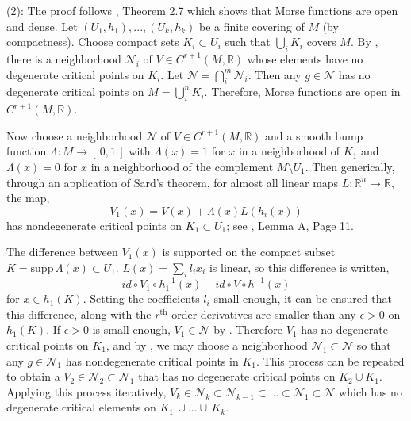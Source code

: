 \documentclass[12pt]{article}
\begin{document}
    (2): The proof follows \cite{milnor2025lectures}, Theorem 2.7 which shows that Morse functions are open and dense. Let $(U_1,h_1),...,(U_k,h_k)$ be a finite covering of $M$ (by compactness). Choose compact sets $K_i \subset U_i$ such that $\bigcup_i K_i$ covers $M$. By , there is a neighborhood $\mathcal{N}_i$ of $V \in C^{r+1}(M,\mathbb{R})$ whose elements have no degenerate critical points on $K_i$. Let $\mathcal{N} = \bigcap_i^m \mathcal{N}_i$. Then any $g \in \mathcal{N}$ has no degenerate critical points on $M = \bigcup_i^n K_i$. Therefore, Morse functions are open in $C^{r+1}(M,\mathbb{R})$.

    Now choose a neighborhood $\mathcal{N}$ of $V \in C^{r+1}(M,\mathbb{R})$ and a smooth bump function $\Lambda: M \rightarrow [\,0,1 \,]$ with $\Lambda(x) = 1$ for $x$ in a neighborhood of $K_1$ and $\Lambda(x) = 0$ for $x$ in a neighborhood of the complement $M \setminus U_1$. Then generically, through an application of Sard's theorem, for almost all linear maps $L: \mathbb{R}^n \rightarrow \mathbb{R}$, the map,
    \begin{equation*}
        V_1(x) = V(x) + \Lambda(x) L(h_i(x))
    \end{equation*}
    has nondegenerate critical points on $K_1 \subset U_1$; see \cite{milnor2025lectures}, Lemma A, Page 11.

    The difference between $V_1(x)$ is supported on the compact subset $K = \text{supp}\, \Lambda(x) \subset U_1$. $L(x) = \sum_i l_i x_i$ is linear, so this difference is written,
    \begin{equation*}
       id \circ V_1 \circ h^{-1}_1(x)  - id \circ V \circ h^{-1} (x)
    \end{equation*}
    for $x \in h_1(K)$. Setting the coefficients $l_i$ small enough, it can be ensured that this difference, along with the $r^{\text{th}}$ order derivatives are smaller than any $\epsilon > 0$ on $h_1(K)$. If $\epsilon > 0$ is small enough, $V_1 \in \mathcal{N}$ by . Therefore $V_1$ has no degenerate critical points on $K_1$, and by , we may choose a neighborhood $\mathcal{N}_1 \subset \mathcal{N}$ so that any $g \in \mathcal{N}_1$ has nondegenerate critical points in $K_1$. This process can be repeated to obtain a $V_2 \in \mathcal{N}_2 \subset \mathcal{N}_1$ that has no degenerate critical points on $K_2 \cup K_1$. Applying this process iteratively, $V_k \in \mathcal{N}_k \subset \mathcal{N}_{k-1} \subset... \subset \mathcal{N}_1 \subset \mathcal{N}$ which has no degenerate critical elements on $K_1 \, \cup ... \cup \, K_k$.
    
\end{document}
